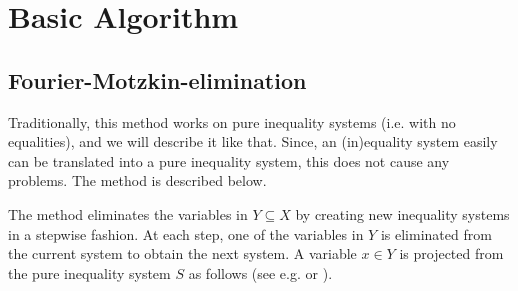 \section{Basic Algorithm}\label{sec:basic}
\subsection{Fourier-Motzkin-elimination}
Traditionally, this method works on pure inequality systems (i.e. with no equalities), and we will describe it like that. Since, an (in)equality system easily can be translated into a pure inequality system, this does not cause any problems. The method is described below.

The method eliminates the variables in $Y\subseteq X$ by creating new inequality systems in a stepwise fashion. At each step, one of the variables in $Y$ is eliminated from the current system to obtain the next system. A variable $x\in Y$ is projected from the pure inequality system $S$ as follows (see e.g. \cite{imbert93} or \cite{ziegler95}).

